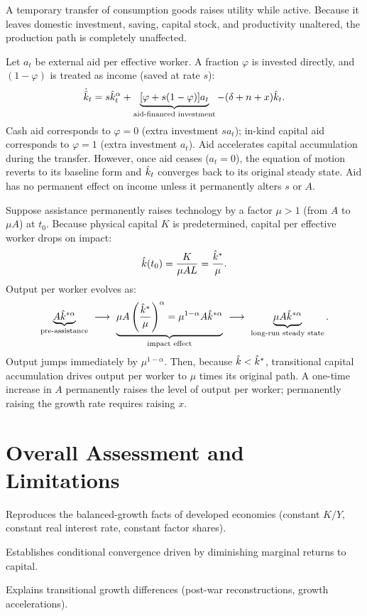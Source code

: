 \documentclass[11pt]{article}
\begin{document}
 A temporary transfer of consumption goods raises utility while active. Because it leaves domestic investment, saving, capital stock, and productivity unaltered, the production path is completely unaffected.

 Let $a_t$ be external aid per effective worker. A fraction $\varphi$ is invested directly, and $(1-\varphi)$ is treated as income (saved at rate $s$):
\[
\dot{\hat{k}}_t = s\hat{k}_t^\alpha + \underbrace{[\varphi + s(1-\varphi)]a_t}_{\text{aid-financed investment}} - (\delta+n+x)\hat{k}_t.
\]
Cash aid corresponds to $\varphi = 0$ (extra investment $sa_t$); in-kind capital aid corresponds to $\varphi = 1$ (extra investment $a_t$). Aid accelerates capital accumulation during the transfer. However, once aid ceases ($a_t = 0$), the equation of motion reverts to its baseline form and $\hat{k}_t$ converges back to its original steady state. Aid has no permanent effect on income unless it permanently alters $s$ or $A$.

 Suppose assistance permanently raises technology by a factor $\mu > 1$ (from $A$ to $\mu A$) at $t_0$. Because physical capital $K$ is predetermined, capital per effective worker drops on impact:
\[
\hat{k}(t_0) = \frac{K}{\mu A L} = \frac{\hat{k}^*}{\mu}.
\]
Output per worker evolves as:
\[
\underbrace{A\kh^{*\alpha}}_{\text{pre-assistance}} \ \longrightarrow \ \underbrace{\mu A \left(\frac{\kh^*}{\mu}\right)^\alpha = \mu^{1-\alpha}A\kh^{*\alpha}}_{\text{impact effect}} \ \longrightarrow \ \underbrace{\mu A\kh^{*\alpha}}_{\text{long-run steady state}}.
\]
Output jumps immediately by $\mu^{1-\alpha}$. Then, because $\hat{k} < \hat{k}^*$, transitional capital accumulation drives output per worker to $\mu$ times its original path. A one-time increase in $A$ permanently raises the level of output per worker; permanently raising the growth rate requires raising $x$.

\section{Overall Assessment and Limitations}

\begin{flatlist}
  \item Reproduces the balanced-growth facts of developed economies (constant $K/Y$, constant real interest rate, constant factor shares).
  \item Establishes conditional convergence driven by diminishing marginal returns to capital.
  \item Explains transitional growth differences (post-war reconstructions, growth accelerations).
\end{flatlist}
\end{document}
